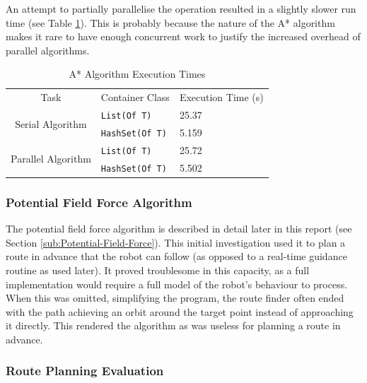 \documentclass[10pt]{article}
\begin{document}
An attempt to partially parallelise the operation resulted in a slightly slower
run time (see Table \ref{tab:aStarTimingsTable}). This is probably because the
nature of the A* algorithm makes it rare to have enough concurrent work to
justify the increased overhead of parallel algorithms.

\begin{singlespace}
\begin{table}
\centering%
\begin{tabular}{|c|m{3cm}|p{2cm}|}
\hline
\multirow{2}{*}{Task} & \multirow{2}{3cm}{Container Class} &
\multirow{2}{2cm}{Execution Time (\si{\second})} \\
 &  & \\
\hline
\multirow{2}{*}{Serial Algorithm} & \texttt{List(Of T)} & \num{25.37}
\\
\cline{2-3}
 & \texttt{HashSet(Of T)} & \num{5.159} \\
\hline
\multirow{2}{*}{Parallel Algorithm} & \texttt{List(Of T)} & \num{25.72}
\\
\cline{2-3}
 & \texttt{HashSet(Of T)} & \num{5.502} \\
\hline
\end{tabular}

\caption{A* Algorithm Execution Times\label{tab:aStarTimingsTable}}
\end{table}

\end{singlespace}

\subsubsection{Potential Field Force Algorithm}

The potential field force algorithm is described in detail later in this report
(see Section \ref{sub:Potential-Field-Force}).  This initial investigation used
it to plan a route in advance that the robot can follow (as opposed to a
real-time guidance routine as used later).  It proved troublesome in this
capacity, as a full implementation would require a full model of the robot's
behaviour to process.  When this was omitted, simplifying the program, the route
finder often ended with the path achieving an orbit around the target point
instead of approaching it directly.  This rendered the algorithm as was useless
for planning a route in advance.

\subsubsection{Route Planning Evaluation}
\end{document}
